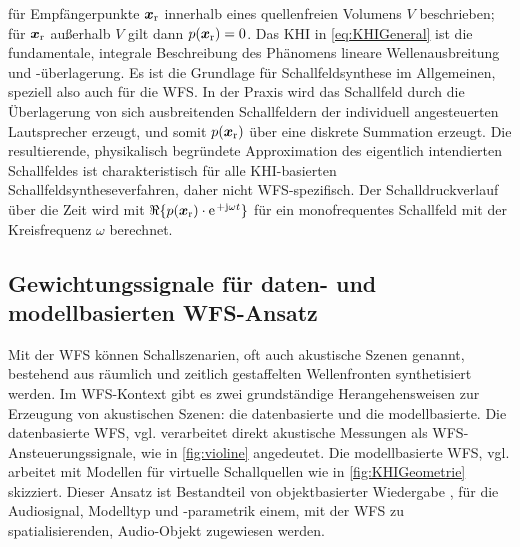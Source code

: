 %
für Empfängerpunkte $\bm{x}_\mathrm{r}$ innerhalb eines quellenfreien Volumens $V$ beschrieben;
%
für $\bm{x}_\mathrm{r}$ außerhalb $V$ gilt dann $p(\bm{x}_\mathrm{r})=0$.
%
Das KHI in \Glg\eqref{eq:KHIGeneral} ist die fundamentale, integrale
Beschreibung des Phänomens lineare Wellenausbreitung und -überlagerung.
%
Es ist die Grundlage für Schallfeldsynthese im Allgemeinen, speziell also auch
für die WFS.
%
In der Praxis wird das Schallfeld durch die
Überlagerung von sich ausbreitenden Schallfeldern der individuell angesteuerten
Lautsprecher erzeugt, und somit $p(\bm{x}_\mathrm{r})$ über eine diskrete Summation erzeugt.
%
Die resultierende, physikalisch begründete Approximation des eigentlich
intendierten Schallfeldes ist charakteristisch für alle KHI-basierten
Schallfeldsyntheseverfahren, daher nicht WFS-spezifisch.
%
Der Schalldruckverlauf über die Zeit wird mit $\Re\{p(\xr)\cdot\e^{+\im \omega t}\}$
für ein monofrequentes Schallfeld mit der Kreisfrequenz $\omega$
berechnet.



\subsection{Gewichtungssignale für daten- und modellbasierten WFS-Ansatz}
%
Mit der WFS können Schallszenarien, oft auch akustische
Szenen genannt, bestehend aus räumlich und zeitlich gestaffelten Wellenfronten
synthetisiert werden.
%
Im WFS-Kontext gibt es zwei grundständige Herangehensweisen zur Erzeugung von
akustischen Szenen: die datenbasierte und die modellbasierte.
%
Die datenbasierte WFS, vgl. \cite{Berkhout1988_JAES}
verarbeitet direkt akustische Messungen als WFS-Ansteuerungssignale,
wie in \Abb\ref{fig:violine} angedeutet.
%
Die modellbasierte WFS, vgl. \cite{Berkhout1993_JASA}
arbeitet mit Modellen für virtuelle Schallquellen wie in
\Abb\ref{fig:KHIGeometrie} skizziert.
%
Dieser Ansatz ist Bestandteil von objektbasierter Wiedergabe
\cite{Vaananen2002, Plogsties2003, Plogsties2003, Brandenburg2004, Geier2008,Spors2013_IEEE,Sporer2018_book},
für die Audiosignal, Modelltyp und -parametrik einem, mit der WFS zu
spatialisierenden, Audio-Objekt zugewiesen werden.




